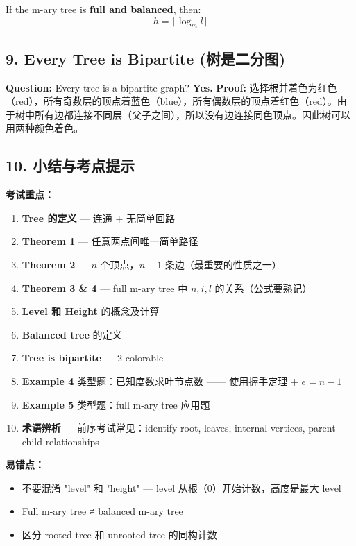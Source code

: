 \documentclass[10pt,a4paper,openany]{ctexbook}
\theoremstyle{definition}
\theoremstyle{remark}
\begin{document}
If the m-ary tree is \textbf{full and balanced}, then:
\[
h = \lceil \log_m l \rceil
\]

\vspace{-2pt}

\subsection{9. Every Tree is Bipartite (树是二分图)}

\textbf{Question:} Every tree is a bipartite graph? \textbf{Yes.}
\textbf{Proof:} 选择根并着色为红色（red），所有奇数层的顶点着蓝色（blue），所有偶数层的顶点着红色（red）。由于树中所有边都连接不同层（父子之间），所以没有边连接同色顶点。因此树可以用两种颜色着色。
\vspace{-2pt}

\subsection{10. 小结与考点提示}

\textbf{考试重点：}
\begin{enumerate}
\item \textbf{Tree 的定义} — 连通 + 无简单回路
\item \textbf{Theorem 1} — 任意两点间唯一简单路径
\item \textbf{Theorem 2} — $n$ 个顶点，$n-1$ 条边（最重要的性质之一）
\item \textbf{Theorem 3 \& 4} — full m-ary tree 中 $n, i, l$ 的关系（公式要熟记）
\item \textbf{Level 和 Height} 的概念及计算
\item \textbf{Balanced tree} 的定义
\item \textbf{Tree is bipartite} — 2-colorable
\item \textbf{Example 4} 类型题：已知度数求叶节点数 —— 使用握手定理 + $e = n-1$
\item \textbf{Example 5} 类型题：full m-ary tree 应用题
\item \textbf{术语辨析} — 前序考试常见：identify root, leaves, internal vertices, parent-child relationships

\end{enumerate}

\textbf{易错点：}
\begin{itemize}
\item 不要混淆 "level" 和 "height" — level 从根（0）开始计数，高度是最大 level
\item Full m-ary tree ≠ balanced m-ary tree
\item 区分 rooted tree 和 unrooted tree 的同构计数

\end{itemize}
\end{document}
